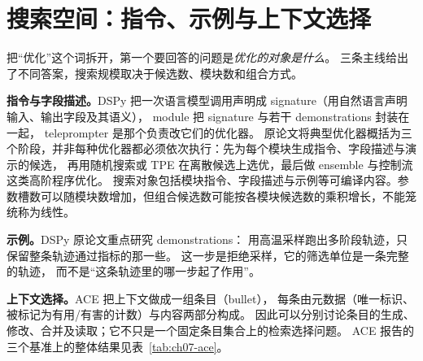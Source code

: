 \section{搜索空间：指令、示例与上下文选择}
\label{sec:ch07-space}

把``优化''这个词拆开，第一个要回答的问题是\emph{优化的对象是什么}。
三条主线给出了不同答案，搜索规模取决于候选数、模块数和组合方式。

\textbf{指令与字段描述。}DSPy 把一次语言模型调用声明成 signature（用自然语言声明输入、输出字段及其语义），
module 把 signature 与若干 demonstrations 封装在一起，
teleprompter 是那个负责改它们的优化器\cite{dspy-2310}。
原论文将典型优化器概括为三个阶段，并非每种优化器都必须依次执行：先为每个模块生成指令、字段描述与演示的候选，
再用随机搜索或 TPE 在离散候选上选优，最后做 ensemble 与控制流这类高阶程序优化\cite{dspy-2310}。
搜索对象包括模块指令、字段描述与示例等可编译内容。参数槽数可以随模块数增加，但组合候选数可能按各模块候选数的乘积增长，不能笼统称为线性。

\textbf{示例。}DSPy 原论文重点研究 demonstrations：
用高温采样跑出多阶段轨迹，只保留整条轨迹通过指标的那一些\cite{dspy-2310}。
这一步是拒绝采样，它的筛选单位是一条完整的轨迹，
而不是``这条轨迹里的哪一步起了作用''。

\textbf{上下文选择。}ACE 把上下文做成一组条目（bullet），
每条由元数据（唯一标识、被标记为有用/有害的计数）与内容两部分构成\cite{ace-2510}。
因此可以分别讨论条目的生成、修改、合并及读取；它不只是一个固定条目集合上的检索选择问题。
ACE 报告的三个基准上的整体结果见表~\ref{tab:ch07-ace}。

